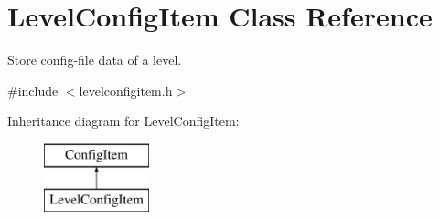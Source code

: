 \hypertarget{classLevelConfigItem}{\section{Level\-Config\-Item Class Reference}
\label{classLevelConfigItem}
}


Store config-\/file data of a level.  




{\ttfamily \#include $<$levelconfigitem.\-h$>$}

Inheritance diagram for Level\-Config\-Item\-:\begin{figure}[H]
\begin{center}
\leavevmode
\includegraphics[height=2.000000cm]{classLevelConfigItem}
\end{center}
\end{figure}
